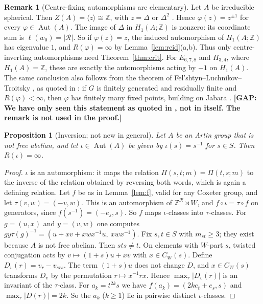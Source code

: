 \documentclass[11pt]{amsart}
\newtheorem{proposition}[theorem]{Proposition}
\theoremstyle{definition}
\newtheorem{remark}[theorem]{Remark}
\newcommand{\Z}{\mathbb{Z}}
\newcommand{\R}{\mathcal{R}}
\newcommand{\Aut}{\operatorname{Aut}}
\newcommand{\GAP}[1]{\textbf{[GAP: #1]}}
\begin{document}
\begin{remark}[Centre-fixing automorphisms are elementary]\label{rem:centre}
Let $A$ be irreducible spherical. Then $Z(A)=\langle z\rangle\cong\Z$, with $z=\Delta$ or $\Delta^2$
\cite{BS72,Del72}. Hence $\varphi(z)=z^{\pm1}$ for every $\varphi\in\Aut(A)$. The image of $\Delta$ in
$H_1(A;\Z)$ is nonzero: its coordinate sum is $\ell(w_0)=|\R|$. So if $\varphi(z)=z$, the induced automorphism of
$H_1(A;\Z)$ has eigenvalue $1$, and $R(\varphi)=\infty$ by Lemma~\ref{lem:reid}(a,b). Thus only centre-inverting
automorphisms need Theorem~\ref{thm:crit}. For $E_{6,7,8}$ and $H_{3,4}$, where $H_1(A)=\Z$, these are exactly
the automorphisms acting by $-1$ on $H_1(A)$. The same conclusion also follows from the theorem of
Fel'shtyn--Luchnikov--Troitsky \cite{FLT15}, as quoted in \cite[\S1]{Tro22}: if $G$ is finitely generated and
residually finite and $R(\varphi)<\infty$, then $\varphi$ has finitely many fixed points, building on Jabara
\cite{Jab08}. \GAP{We have only seen this statement as quoted in \cite{Tro22}, not in \cite{FLT15} itself. The
remark is not used in the proof.}
\end{remark}

\begin{proposition}[Inversion; not new in general]\label{prop:inv}
Let $A$ be an Artin group that is not free abelian, and let $\iota\in\Aut(A)$ be given by $\iota(s)=s^{-1}$ for
$s\in S$. Then $R(\iota)=\infty$.
\end{proposition}
\begin{proof}
$\iota$ is an automorphism: it maps the relation $\Pi(s,t;m)=\Pi(t,s;m)$ to the inverse of the relation obtained by
reversing both words, which is again a defining relation. Let $f$ be as in Lemma~\ref{lem:f}, valid for any
Coxeter group, and let $\tau(v,w)=(-v,w)$. This is an automorphism of $\Z^\R\rtimes W$, and $f\circ\iota=\tau\circ f$
on generators, since $f(s^{-1})=(-e_s,s)$. So $f$ maps $\iota$-classes into $\tau$-classes. For $g=(u,x)$ and
$y=(v,w)$ one computes $gy\tau(g)^{-1}=(u+xv+xwx^{-1}u,\ xwx^{-1})$. Fix $s,t\in S$ with $m_{st}\ge3$; they exist
because $A$ is not free abelian. Then $sts\ne t$. On elements with $W$-part $s$, twisted conjugation acts by
$v\mapsto(1+s)u+xv$ with $x\in C_W(s)$. Define $D_v(r)=v_r-v_{srs}$. The term $(1+s)u$ does not change $D$, and
$x\in C_W(s)$ transforms $D_v$ by the permutation $r\mapsto x^{-1}rx$. Hence
$\max_r|D_v(r)|$ is an invariant of the $\tau$-class. For $a_k=t^{2k}s$ we have $f(a_k)=(2ke_t+e_s,s)$ and
$\max_r|D(r)|=2k$. So the $a_k$ ($k\ge1$) lie in pairwise distinct $\iota$-classes.
\end{proof}
\end{document}
